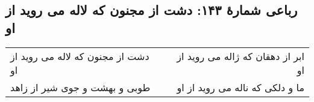 \begin{center}
\section*{رباعی شمارهٔ ۱۴۳: دشت از مجنون که لاله می روید از او}
\label{sec:143}
\begin{longtable}{l p{0.5cm} r}
دشت از مجنون که لاله می روید از او
&&
ابر از دهقان که ژاله می روید از او
\\
طوبی و بهشت و جوی شیر از زاهد
&&
ما و دلکی که ناله می روید از او
\\
\end{longtable}
\end{center}
